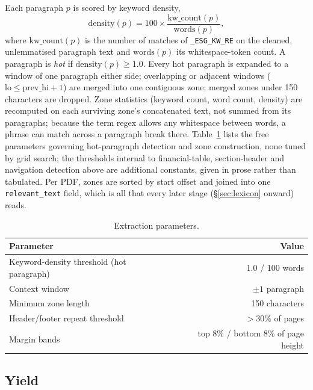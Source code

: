 Each paragraph $p$ is scored by keyword density,
\begin{equation}
\mathrm{density}(p) = 100 \times \frac{\mathrm{kw\_count}(p)}{\mathrm{words}(p)},
\label{eq:kw-density}
\end{equation}
where $\mathrm{kw\_count}(p)$ is the number of matches of
\texttt{\_ESG\_KW\_RE} on the cleaned, unlemmatised paragraph text and $\mathrm{words}(p)$ its
whitespace-token count.
A paragraph is \emph{hot} if $\mathrm{density}(p) \geq 1.0$. Every hot
paragraph is expanded to a window of one paragraph either side; overlapping
or adjacent windows ($\mathrm{lo} \leq \mathrm{prev\_hi}+1$) are merged into
one contiguous zone; merged zones under 150 characters are dropped. Zone
statistics (keyword count, word count, density) are recomputed on each
surviving zone's concatenated text, not summed from its paragraphs; because
the term regex allows any whitespace between words, a phrase can match across
a paragraph break there.
Table~\ref{tab:extraction-params} lists the free parameters governing hot-paragraph
detection and zone construction, none tuned by grid search; the thresholds internal to
financial-table, section-header and navigation detection above are additional
constants, given in prose rather than tabulated. Per PDF, zones are sorted by start offset and joined
into one \texttt{relevant\_text} field, which is all that every later stage
(\S\ref{sec:lexicon} onward) reads.

\begin{table}[tbp]
\centering
\caption{Extraction parameters.}
\label{tab:extraction-params}
\begin{tabular}{lr}
\toprule
Parameter & Value \\
\midrule
Keyword-density threshold (hot paragraph) & 1.0 / 100 words \\
Context window & $\pm 1$ paragraph \\
Minimum zone length & 150 characters \\
Header/footer repeat threshold & $>30\%$ of pages \\
Margin bands & top 8\% / bottom 8\% of page height \\
\bottomrule
\end{tabular}
\end{table}

\subsection{Yield}
\label{sec:extraction-yield}

